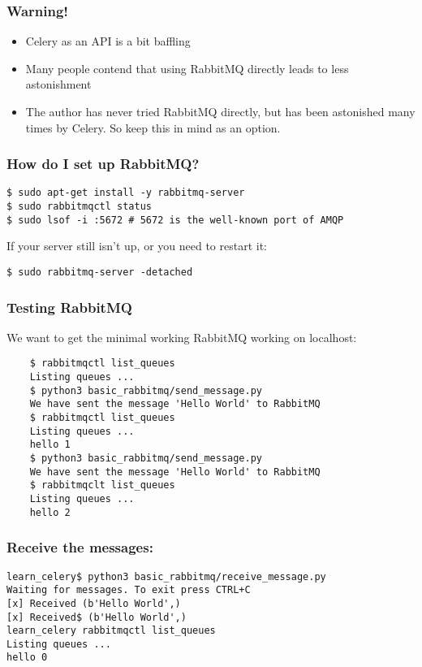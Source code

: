 \documentclass[9pt]{beamer}
\begin{document}
\begin{frame}[fragile]
  \frametitle{Warning!}
  \begin{itemize}
  \item Celery as an API is a bit baffling
    \pause
  \item Many people contend that using RabbitMQ directly leads to less astonishment
    \pause
  \item The author has never tried RabbitMQ directly, but has been astonished many times by Celery. So keep this in mind as an option.
  \end{itemize}
\end{frame}

\begin{frame}[fragile]
  \frametitle{How do I set up RabbitMQ?}
  \begin{verbatim}
$ sudo apt-get install -y rabbitmq-server
$ sudo rabbitmqctl status
$ sudo lsof -i :5672 # 5672 is the well-known port of AMQP
  \end{verbatim}
  If your server still isn't up, or you need to restart it:
  \begin{verbatim}
$ sudo rabbitmq-server -detached 
  \end{verbatim}
\end{frame}

\begin{frame}[fragile]
  \frametitle{Testing RabbitMQ}
  We want to get the minimal working RabbitMQ working on localhost:
  \begin{verbatim}
    $ rabbitmqctl list_queues
    Listing queues ...
    $ python3 basic_rabbitmq/send_message.py
    We have sent the message 'Hello World' to RabbitMQ
    $ rabbitmqctl list_queues
    Listing queues ...
    hello 1
    $ python3 basic_rabbitmq/send_message.py
    We have sent the message 'Hello World' to RabbitMQ
    $ rabbitmqclt list_queues
    Listing queues ...
    hello 2
  \end{verbatim}
\end{frame}

\begin{frame}[fragile]
  \frametitle{Receive the messages:}
  \begin{verbatim}
learn_celery$ python3 basic_rabbitmq/receive_message.py
Waiting for messages. To exit press CTRL+C
[x] Received (b'Hello World',)
[x] Received$ (b'Hello World',)
learn_celery rabbitmqctl list_queues
Listing queues ...
hello 0
  \end{verbatim}
\end{frame}
\end{document}
